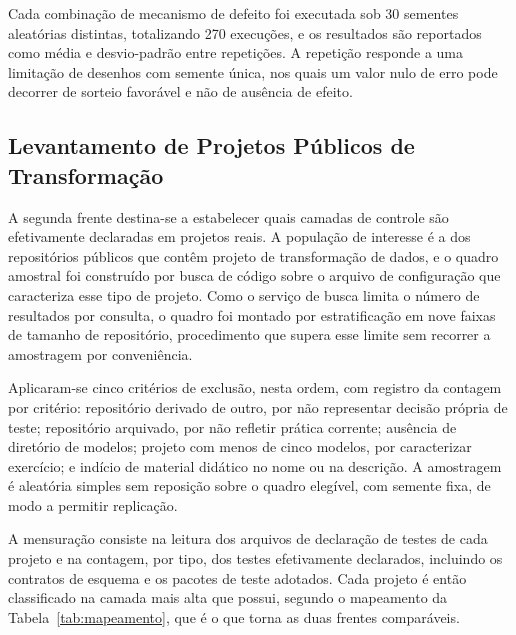 \documentclass[11pt,a4paper]{article}
\begin{document}
Cada combinação de mecanismo de defeito foi executada sob 30 sementes
aleatórias distintas, totalizando 270 execuções, e os resultados são
reportados como média e desvio-padrão entre repetições. A repetição
responde a uma limitação de desenhos com semente única, nos quais um valor
nulo de erro pode decorrer de sorteio favorável e não de ausência de
efeito.

\subsection{Levantamento de Projetos Públicos de Transformação}

A segunda frente destina-se a estabelecer quais camadas de controle são
efetivamente declaradas em projetos reais. A população de interesse é a dos
repositórios públicos que contêm projeto de transformação de dados, e o
quadro amostral foi construído por busca de código sobre o arquivo de
configuração que caracteriza esse tipo de projeto. Como o serviço de busca
limita o número de resultados por consulta, o quadro foi montado por
estratificação em nove faixas de tamanho de repositório, procedimento que
supera esse limite sem recorrer a amostragem por conveniência.

Aplicaram-se cinco critérios de exclusão, nesta ordem, com registro da
contagem por critério: repositório derivado de outro, por não representar
decisão própria de teste; repositório arquivado, por não refletir prática
corrente; ausência de diretório de modelos; projeto com menos de cinco
modelos, por caracterizar exercício; e indício de material didático no nome
ou na descrição. A amostragem é aleatória simples sem reposição sobre o
quadro elegível, com semente fixa, de modo a permitir replicação.

A mensuração consiste na leitura dos arquivos de declaração de testes de
cada projeto e na contagem, por tipo, dos testes efetivamente declarados,
incluindo os contratos de esquema e os pacotes de teste adotados. Cada
projeto é então classificado na camada mais alta que possui, segundo o
mapeamento da Tabela~\ref{tab:mapeamento}, que é o que torna as duas
frentes comparáveis.
\end{document}
